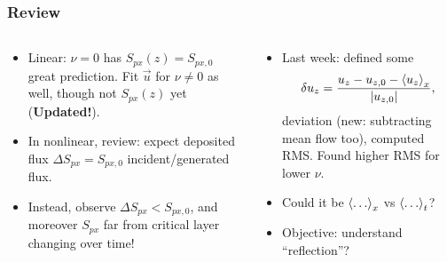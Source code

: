 \documentclass[dvipsnames]{beamer}
\DeclarePairedDelimiter\abs{\lvert}{\rvert}
\DeclarePairedDelimiter\ev{\langle}{\rangle}
\begin{document}
\begin{frame}
    \frametitle{Review}

    \begin{columns}
        \begin{column}{0.5\textwidth}
            \begin{itemize}
                \item Linear: $\nu = 0$ has $S_{px}(z) = S_{px, 0}$ great
                    prediction. Fit $\vec{u}$ for $\nu \neq 0$ as well, though
                    not $S_{px}(z)$ yet (\textbf{Updated!}).

                \item In nonlinear, review: expect deposited flux $\Delta S_{px}
                    = S_{px, 0}$ incident/generated flux.

                \item Instead, observe $\Delta S_{px} < S_{px, 0}$, and moreover
                    $S_{px}$ far from critical layer changing over time!
            \end{itemize}
        \end{column}
        \begin{column}{0.5\textwidth}
            \begin{itemize}
                \item Last week: defined some
                    \begin{equation}
                        \delta u_z = \frac{u_z - u_{z, 0}
                            - \ev*{u_z}_x}{\abs*{u_{z, 0}}},
                    \end{equation}
                    deviation (new: subtracting mean flow too), computed RMS\@.
                    Found higher RMS for lower $\nu$.

                \item Could it be $\ev*{\dots}_x$ vs $\ev*{\dots}_t$?

                \item Objective: understand ``reflection''?
            \end{itemize}
        \end{column}
    \end{columns}
\end{frame}
\end{document}
